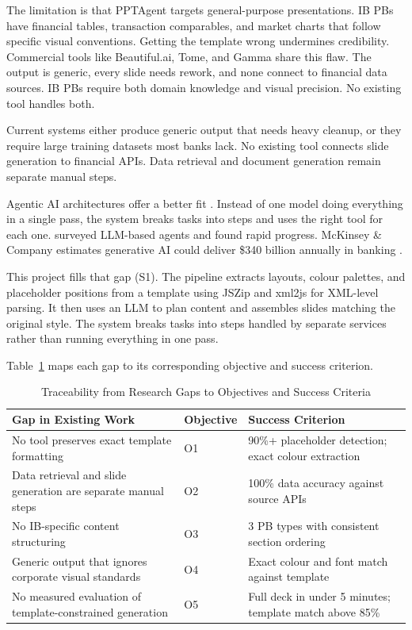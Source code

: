 The limitation is that PPTAgent targets general-purpose presentations. IB PBs have financial tables, transaction comparables, and market charts that follow specific visual conventions. Getting the template wrong undermines credibility. Commercial tools like Beautiful.ai, Tome, and Gamma share this flaw. The output is generic, every slide needs rework, and none connect to financial data sources. IB PBs require both domain knowledge and visual precision. No existing tool handles both.

Current systems either produce generic output that needs heavy cleanup, or they require large training datasets most banks lack. No existing tool connects slide generation to financial APIs. Data retrieval and document generation remain separate manual steps.

Agentic AI architectures offer a better fit \parencite{ibm2024}. Instead of one model doing everything in a single pass, the system breaks tasks into steps and uses the right tool for each one. \textcite{wang2024} surveyed LLM-based agents and found rapid progress. McKinsey \& Company estimates generative AI could deliver \$340 billion annually in banking \parencite{mckinsey2024}.

This project fills that gap (S1). The pipeline extracts layouts, colour palettes, and placeholder positions from a template using JSZip and xml2js for XML-level parsing. It then uses an LLM to plan content and assembles slides matching the original style. The system breaks tasks into steps handled by separate services rather than running everything in one pass.

Table~\ref{tab:gap-objectives} maps each gap to its corresponding objective and success criterion.

\begin{table}[H]
\centering
\begin{tabular}{|p{4.2cm}|l|p{4.5cm}|}
\hline
\rowcolor{gray!20} \textbf{Gap in Existing Work} & \textbf{Objective} & \textbf{Success Criterion} \\
\hline
No tool preserves exact template formatting & O1 & 90\%+ placeholder detection; exact colour extraction \\
\hline
Data retrieval and slide generation are separate manual steps & O2 & 100\% data accuracy against source APIs \\
\hline
No IB-specific content structuring & O3 & 3 PB types with consistent section ordering \\
\hline
Generic output that ignores corporate visual standards & O4 & Exact colour and font match against template \\
\hline
No measured evaluation of template-constrained generation & O5 & Full deck in under 5 minutes; template match above 85\% \\
\hline
\end{tabular}
\caption{Traceability from Research Gaps to Objectives and Success Criteria}
\label{tab:gap-objectives}
\end{table}

